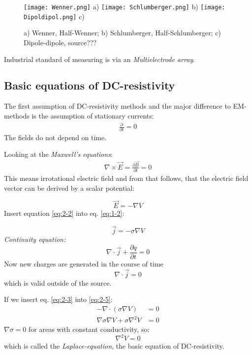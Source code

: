 \begin{figure}[H]
\begin{center}
\texttt{[image: Wenner.png]}
a)
\texttt{[image: Schlumberger.png]}
b)
\texttt{[image: Dipoldipol.png]}
c)
\caption{a) Wenner, Half-Wenner; b) Schlumberger, Half-Schlumberger; c) Dipole-dipole, source???}
\label{fig:dc02}
\end{center}
\end{figure}

Industrial standard of measuring is via an \textit{Multielectrode array}.


\subsection{Basic equations of DC-resistivity}
The first assumption of DC-resistivity methods and the major difference to EM-methods is the assumption of stationary currents:
\begin{align*}
\frac{\partial}{\partial t}=0
\end{align*}
The fields do not depend on time.

Looking at the \textit{Maxwell's equations}:
\begin{align}
\nabla\times\vec{E}=\frac{\partial \vec{B}}{\partial t}=0
\end{align}
This means irrotational electric field and from that follows, that the electric field vector can be derived by a scalar potential:

\begin{equation}
\vec{E}=-\nabla V \label{eq:2-2}
\end{equation}
Insert equation \eqref{eq:2-2} into eq. \eqref{eq:1-2}:

\begin{equation}
\vec{j}=-\sigma \nabla V\label{eq:2-3}
\end{equation}
\textit{Continuity equation:}
\begin{equation}
\nabla\cdot\vec{j}+\frac{\partial q}{\partial t}=0
\end{equation}
Now new charges are generated in the course of time
\begin{equation}
\nabla\cdot\vec{j}=0 \label{eq:2-5}
\end{equation}
which is valid outside of the source.

If we insert eq. \eqref{eq:2-3} into \eqref{eq:2-5}:
\begin{align*}
-\nabla\cdot(\sigma\nabla V)&=0\\
\nabla\sigma\nabla V + \sigma\nabla^2V&=0
\end{align*}
$\nabla\sigma=0$ for areas with constant conductivity, so:
\begin{equation}
\nabla^2 V=0\label{eq:lapleq}
\end{equation}
which is called the \textit{Laplace-equation}, the basic equation of DC-resistivity.

